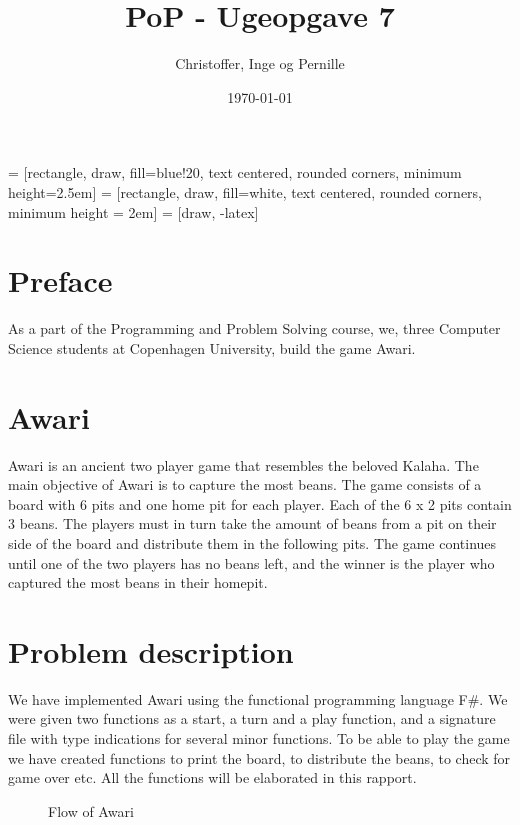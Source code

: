 \documentclass[a4paper]{report}
\title{PoP - Ugeopgave 7}
\author{Christoffer, Inge og Pernille}
\date{\today}
\begin{document}
\maketitle
{} = [rectangle, draw, fill=blue!20, text centered,
    rounded corners, minimum height=2.5em]
 = [rectangle, draw, fill=white, text centered,
    rounded corners, minimum height = 2em]
 = [draw, -latex]

\section*{Preface}
As a part of the Programming and Problem Solving course, we,
three Computer Science students at Copenhagen University, build the game Awari.

\section*{Awari}
Awari is an ancient two player game that resembles the beloved Kalaha. The main
objective of Awari is to capture the most beans. The game consists of a board
with 6 pits and one home pit for each player. Each of the 6 x 2 pits contain
3 beans. The players must in turn take the amount of beans from a pit on their 
side of the board and distribute them in the following pits. The game
continues until one of the two players has no beans left, and the winner is the
player who captured the most beans in their homepit.

\section*{Problem description}
We have implemented Awari using the functional programming language F\#. We
were given two functions as a start, a turn and a play function, and a signature
file with type indications for several minor functions. To be able to play the
game we have created functions to print the board, to distribute the beans, to
check for game over etc. All the functions will be elaborated in this rapport.

\begin{figure}
\centering
{}
\caption{Flow of Awari}
\label{fig:gameflow}
\end{figure}
\end{document}
